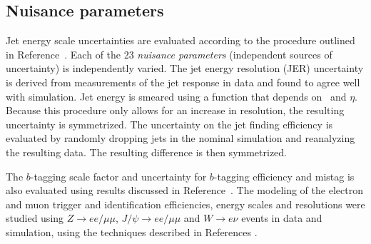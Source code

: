 \subsection{Nuisance parameters}
\label{ss:np}
Jet energy scale uncertainties are evaluated according to the procedure outlined in Reference~\cite{JES}.
Each of the 23 \emph{nuisance parameters} (independent sources of uncertainty) is independently varied.
The jet energy resolution (JER) uncertainty is derived from measurements of the jet response in data and found to agree well with simulation. Jet energy is smeared using
a function that depends on  \pt\ and $\eta$.    Because this procedure only allows for an increase in resolution, 
the resulting uncertainty is symmetrized.
The uncertainty on the jet finding efficiency is evaluated by randomly dropping jets in the nominal simulation
and reanalyzing the resulting data.  The resulting difference is then symmetrized. 


The $b$-tagging scale factor and uncertainty for $b$-tagging efficiency and mistag is also evaluated using results discussed in Reference~\cite{btagpaper}. The modeling of the electron
and muon trigger and identification efficiencies, energy scales and resolutions 
were studied using $Z\rightarrow ee/\mu\mu$, $J/\psi\rightarrow ee/\mu\mu$ and
$W\rightarrow e\nu$ events in data and simulation, using the techniques
described in References \cite{PERF-2013-03,PERF-2013-05,PERF-2014-05}.


